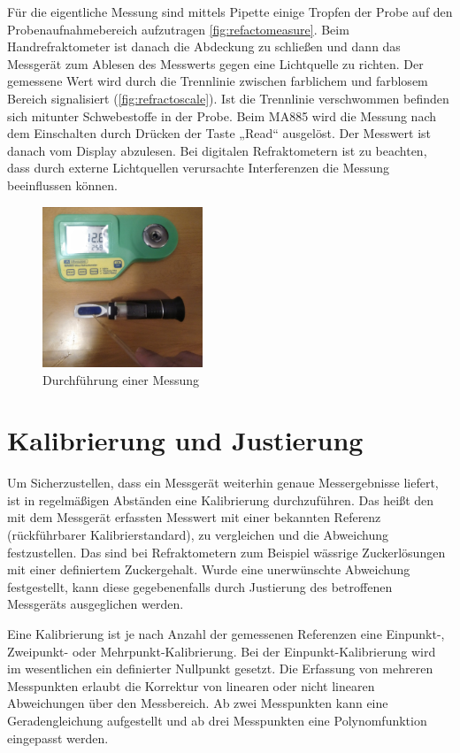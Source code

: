 \documentclass[a4paper,parskip=half]{scrartcl}
\begin{document}
Für die eigentliche Messung sind mittels Pipette einige Tropfen
der Probe auf den Probenaufnahmebereich aufzutragen
\autoref{fig:refactomeasure}. Beim Handrefraktometer
ist danach die Abdeckung zu schließen und dann das Messgerät
zum Ablesen des Messwerts gegen eine Lichtquelle zu richten.
Der gemessene Wert wird durch die Trennlinie zwischen
farblichem und farblosem Bereich signalisiert (\autoref{fig:refractoscale}).
Ist die Trennlinie verschwommen befinden sich mitunter Schwebestoffe
in der Probe. Beim MA885 wird die Messung nach
dem Einschalten durch Drücken der Taste „Read“ ausgelöst. Der
Messwert ist danach vom Display abzulesen. Bei digitalen
Refraktometern ist zu beachten, dass durch externe Lichtquellen
verursachte Interferenzen die Messung beeinflussen können.
\autocite{Gossett2012a,Terrill2013}

\begin{figure}[h]
\centering
\includegraphics[width=4.8cm]{images/measure.jpg}
\caption{Durchführung einer Messung}
\label{fig:refactomeasure}
\end{figure}

\section*{Kalibrierung und Justierung}

Um Sicherzustellen, dass ein Messgerät weiterhin genaue Messergebnisse
liefert, ist in regelmäßigen Abständen eine Kalibrierung durchzuführen.
Das heißt den mit dem Messgerät erfassten Messwert mit einer bekannten
Referenz (rückführbarer Kalibrierstandard), zu vergleichen und die
Abweichung festzustellen. Das sind bei Refraktometern zum Beispiel
wässrige Zuckerlösungen mit einer definiertem Zuckergehalt.
Wurde eine unerwünschte Abweichung festgestellt, kann diese gegebenenfalls
durch Justierung des betroffenen Messgeräts ausgeglichen werden.

Eine Kalibrierung ist je nach Anzahl der gemessenen Referenzen
eine Einpunkt-, Zweipunkt- oder Mehrpunkt-Kalibrierung.
Bei der Einpunkt-Kalibrierung wird im wesentlichen ein definierter
Nullpunkt gesetzt. Die Erfassung von mehreren Messpunkten erlaubt
die Korrektur von linearen oder nicht linearen Abweichungen
über den Messbereich. Ab zwei Messpunkten kann eine Geradengleichung
aufgestellt und ab drei Messpunkten eine Polynomfunktion eingepasst
werden. \autocite{Earl2015}
\end{document}
